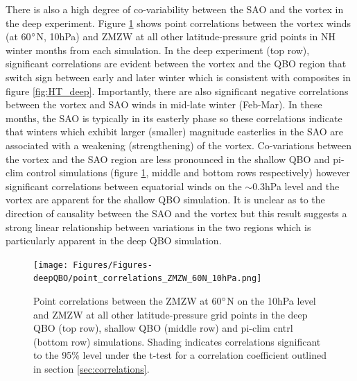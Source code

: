 There is also a high degree of co-variability between the SAO and the vortex in the deep experiment. Figure \ref{fig:point_cors} shows point correlations between the vortex winds (at 60$\degree$N, 10hPa) and ZMZW at all other latitude-pressure grid points in NH winter months from each simulation. In the deep experiment (top row), significant correlations are evident between the vortex and the QBO region that switch sign between early and later winter which is consistent with composites in figure \ref{fig:HT_deep}. Importantly, there are also significant negative correlations between the vortex and SAO winds in mid-late winter (Feb-Mar). In these months, the SAO is typically in its easterly phase so these correlations indicate that winters which exhibit larger (smaller) magnitude easterlies in the SAO are associated with a weakening (strengthening) of the vortex. Co-variations between the vortex and the SAO region are less pronounced in the shallow QBO and pi-clim control simulations (figure \ref{fig:point_cors}, middle and bottom rows respectively) however significant correlations between equatorial winds on the $\sim$0.3hPa level and the vortex are apparent for the shallow QBO simulation. It is unclear as to the direction of causality between
the SAO and the vortex but this result suggests a strong linear relationship between variations in the two regions which is particularly apparent in the deep QBO simulation.

\begin{figure}[h!]
\begin{center}
\noindent\texttt{[image: Figures/Figures-deepQBO/point\_correlations\_ZMZW\_60N\_10hPa.png]}
\caption[Point correlations between vortex ZMZWs and winds at other points in QBO experiments]{Point correlations between the ZMZW at 60$\degree$N on the 10hPa level and ZMZW at all other latitude-pressure grid points in the deep QBO (top row), shallow QBO (middle row) and pi-clim cntrl (bottom row) simulations. Shading indicates correlations significant to the 95\% level under the t-test for a correlation coefficient outlined in section \ref{sec:correlations}.}
\label{fig:point_cors}
\end{center}
\end{figure}

